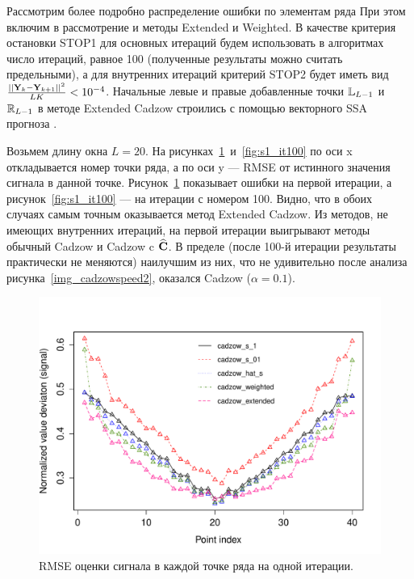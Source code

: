 \documentclass[12pt,a4paper,fleqn,leqno]{article}
\begin{document}
Рассмотрим более подробно распределение ошибки по элементам ряда При этом включим в рассмотрение и
методы Extended и Weighted.
В качестве критерия остановки STOP1 для основных итераций будем использовать в алгоритмах число итераций, равное 100 (полученные результаты
можно считать предельными), а для внутренних итераций критерий STOP2 будет иметь вид $\frac{||\mathbf{Y}_k - \mathbf{Y}_{k+1}||^2}{LK} < 10^{-4}$. 
Начальные левые и правые добавленные точки $\mathbb{L}_{L-1}$ и $\mathbb{R}_{L-1}$  
в методе Extended Cadzow строились с помощью векторного SSA прогноза \cite[раздел 2.3.1]{Golyandina.etal2001}.

Возьмем длину окна $L=20$.  На рисунках~\ref{fig:s1_it1}~и~\ref{fig:s1_it100} по оси x откладывается номер точки ряда,
а по оси y --- RMSE от истинного значения сигнала в данной точке. Рисунок~\ref{fig:s1_it1} показывает ошибки на первой итерации,
а рисунок~\ref{fig:s1_it100} --- на итерации с номером 100.
Видно, что в обоих случаях самым точным оказывается метод Extended Cadzow. Из методов, не имеющих внутренних итераций,
на первой итерации выигрывают методы обычный Cadzow и Cadzow c $\widehat{\mathbf{C}}$. В пределе (после 100-й итерации результаты практически не меняются)
наилучшим из них, что не удивительно после анализа рисунка~\ref{img_cadzowspeed2}, оказался Cadzow ($\alpha=0.1$). 

\begin{figure}[!hhh]
\begin{center}
\includegraphics[width = 13cm]{s1_it1.pdf}
\caption{RMSE оценки сигнала в каждой точке ряда на одной итерации.}
\label{fig:s1_it1}
\end{center}
\end{figure}
\end{document}

